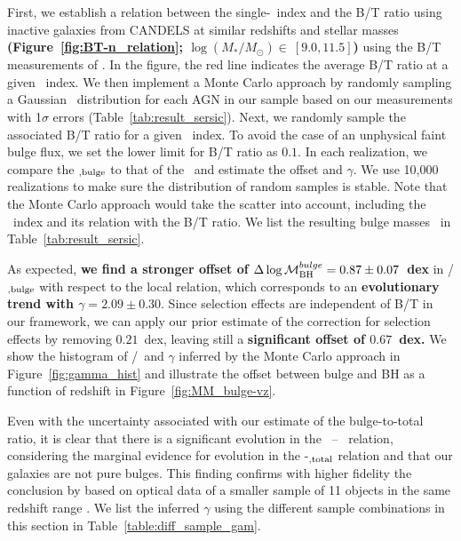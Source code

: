 \documentclass[apj]{emulateapj}
\begin{document}
First, we establish a relation between the single-\sersic\ index and the B/T ratio using inactive galaxies from CANDELS at similar redshifts and stellar masses {\bf (Figure~\ref{fig:BT-n_relation}; $\log (M_*/M_{\odot})\in~ [9.0, 11.5]$)} using the B/T measurements of \citet{Dimauro2018}. In the figure, the red line indicates the average B/T ratio at a given \sersic\ index. We then implement a Monte Carlo approach by randomly sampling a Gaussian \sersic\ distribution for each AGN in our sample based on our measurements with 1$\sigma$ errors (Table~\ref{tab:result_sersic}). Next, we randomly sample the associated B/T ratio for a given \sersic\ index. To avoid the case of an unphysical faint bulge flux, we set the lower limit for B/T ratio as $0.1$. In each realization, we compare the \smass$_{\rm, bulge}$ to that of the \mbh\ and estimate the offset and $\gamma$.  We use 10,000 realizations to make sure the distribution of random samples is stable. Note that the Monte Carlo approach would take the scatter into account, including the \sersic\ index and its relation with the B/T ratio. We list the resulting bulge masses \bmass\ in Table~\ref{tab:result_sersic}.

As expected, {\bf we find a stronger offset of
$\Delta \log \mathcal M_{\rm BH}^{bulge} = 0.87\pm0.07$~dex } in \mbh/\smass$_{\rm, bulge}$ with respect to the
local relation, which corresponds to an {\bf evolutionary trend with
$\gamma = 2.09\pm0.30$}. Since selection effects are independent of B/T in
our framework, we can apply our prior estimate of the correction for selection effects by removing $0.21$~dex, leaving still a {\bf significant offset
of $0.67$~dex.} We show the histogram of  \mbh/\smass\ and $\gamma$ inferred by
the Monte Carlo approach in Figure~\ref{fig:gamma_hist} and illustrate the offset between bulge and BH
as a function of redshift in Figure~\ref{fig:MM_bulge-vz}.

Even with the uncertainty associated with our estimate of the
bulge-to-total ratio, it is clear that there is a significant evolution
in the \mbh\ -- \bmass\ relation, considering the
marginal evidence for evolution in the \mbh-\smass$_{\rm, total}$
relation and that our galaxies are not pure bulges. This finding
confirms with higher fidelity the conclusion by \citet{Bennert11}
based on optical data of a smaller sample of 11 objects in the same
redshift range \citep[see][for similar results]{SS13, Jah++09, Cisternas2011}. We list the inferred $\gamma$ using the different sample combinations in this section in
Table~\ref{table:diff_sample_gam}.
\end{document}
